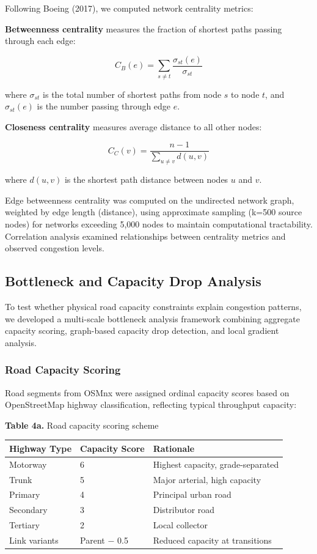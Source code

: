 \documentclass[12pt,a4paper]{article}
\begin{document}
Following Boeing (2017), we computed network centrality metrics:

\textbf{Betweenness centrality} measures the fraction of shortest paths passing through each edge:

\[C_B(e) = \sum_{s \neq t} \frac{\sigma_{st}(e)}{\sigma_{st}}\]

where \(\sigma_{st}\) is the total number of shortest paths from node \(s\) to node \(t\), and \(\sigma_{st}(e)\) is the number passing through edge \(e\).

\textbf{Closeness centrality} measures average distance to all other nodes:

\[C_C(v) = \frac{n-1}{\sum_{u \neq v} d(u,v)}\]

where \(d(u,v)\) is the shortest path distance between nodes \(u\) and \(v\).

Edge betweenness centrality was computed on the undirected network graph, weighted by edge length (distance), using approximate sampling (k=500 source nodes) for networks exceeding 5,000 nodes to maintain computational tractability. Correlation analysis examined relationships between centrality metrics and observed congestion levels.

\subsection{Bottleneck and Capacity Drop Analysis}

To test whether physical road capacity constraints explain congestion patterns, we developed a multi-scale bottleneck analysis framework combining aggregate capacity scoring, graph-based capacity drop detection, and local gradient analysis.

\subsubsection{Road Capacity Scoring}

Road segments from OSMnx were assigned ordinal capacity scores based on OpenStreetMap highway classification, reflecting typical throughput capacity:

\textbf{Table 4a.} Road capacity scoring scheme

\begin{longtable}[]{@{}lll@{}}
\toprule\noalign{}
Highway Type & Capacity Score & Rationale \\
\midrule\noalign{}
\endhead
\bottomrule\noalign{}
\endlastfoot
Motorway & 6 & Highest capacity, grade-separated \\
Trunk & 5 & Major arterial, high capacity \\
Primary & 4 & Principal urban road \\
Secondary & 3 & Distributor road \\
Tertiary & 2 & Local collector \\
Link variants & Parent $-$ 0.5 & Reduced capacity at transitions \\
\end{longtable}
\end{document}
